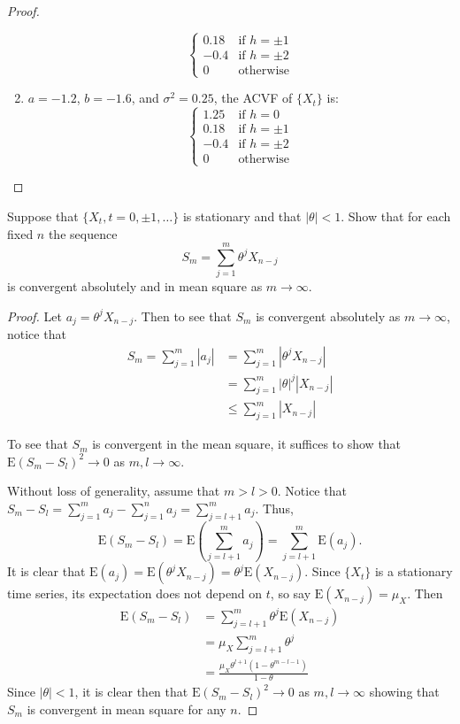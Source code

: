 \documentclass[12pt]{article}
\theoremstyle{definition}
\newenvironment{custompbm}[1]
  {\renewcommand\theproblem{#1}\problem}
  {\endproblem}
\newcommand{\E}{\text{E}}
\begin{document}
\begin{proof}
\begin{enumerate}
\[\begin{cases}
          0.18 & \text{if $h=\pm1$}\\
          -0.4 & \text{if $h=\pm2$}\\
          0 & \text{otherwise}
        \end{cases}
      \]
    \item $a=-1.2$, $b=-1.6$, and $\sigma^2=0.25$, the ACVF of $\{X_t\}$ is:
      \[
        \begin{cases}
          1.25 & \text{if $h=0$}\\
          0.18 & \text{if $h=\pm1$}\\
          -0.4 & \text{if $h=\pm2$}\\
          0 & \text{otherwise}
        \end{cases}
      \]
  \end{enumerate}
\end{proof}




\begin{custompbm}{2.5}
  Suppose that $\{X_t, t=0, \pm1, \dots\}$ is stationary and that $|\theta|<1$.
  Show that for each fixed $n$ the sequence
  \[
    S_m = \sum_{j=1}^{m} \theta ^ j X_{n-j}
  \]
  is convergent absolutely and in mean square as $m \to \infty$.
\end{custompbm}

\begin{proof}
  Let $a_j = \theta ^ j X_{n-j}$. Then to see that $S_m$ is convergent absolutely
  as $m \to \infty$, notice that
  \begin{align*}
    S_m = \sum_{j=1}^{m} |a_j|
    &= \sum_{j=1}^{m} |\theta ^ j X_{n-j}| \\
    &= \sum_{j=1}^{m} |\theta| ^ j |X_{n-j}|\\
    &\leq \sum_{j=1}^{m} |X_{n-j}|
  \end{align*}

  To see that $S_m$ is convergent in the mean square, it suffices to show that
  $\E(S_m - S_l)^2 \to 0$ as $m, l \to \infty$.

  Without loss of generality, assume that $m > l > 0$. Notice that
  $S_m - S_l = \sum_{j=1}^m a_j - \sum_{j=1}^n a_j = \sum_{j=l+1}^{m} a_j$.
  Thus, $$\E(S_m - S_l) = \E(\sum_{j=l+1}^{m} a_j) = \sum_{j=l+1}^m \E(a_j).$$
  It is clear that $\E(a_j) = \E(\theta^j X_{n-j}) = \theta^j \E(X_{n-j})$. Since
  $\{X_t\}$ is a stationary time series, its expectation does not depend on $t$,
  so say $\E(X_{n-j}) = \mu_X$. Then
  \begin{align*}
    \E(S_m - S_l)
    &= \sum_{j=l+1}^m \theta^j\E(X_{n-j}) \\
    &=\mu_X \sum_{j=l+1}^m \theta^j \\
    &= \frac{\mu_X\theta^{l+1}(1-\theta^{m-l-1})}{1-\theta}
  \end{align*}
  Since $|\theta| < 1$, it is clear then that $\E(S_m - S_l)^2 \to 0$ as $m,l \to \infty$
  showing that $S_m$ is convergent in mean square for any $n$.
\end{proof}
\end{document}
